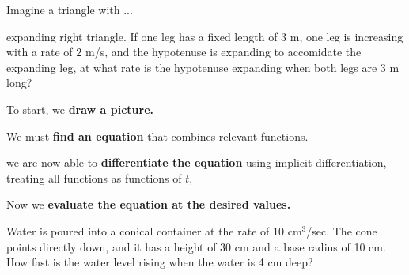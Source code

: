 \documentclass{ximera}
\begin{document}
\begin{example}
  Imagine a triangle with ...
  \begin{image}
  \end{image} 
  expanding right triangle. If one leg has a fixed length
  of $3$ m, one leg is increasing with a rate of $2$ m/s, and the
  hypotenuse is expanding to accomidate the expanding leg, at what
  rate is the hypotenuse expanding when both legs are $3$ m long? 
  \begin{explanation}
    To start, we \textbf{draw a picture.}
 

    We must \textbf{find an equation} that combines relevant
    functions.

    
    we are now able to \textbf{differentiate the equation} using
    implicit differentiation, treating all functions as functions of
    $t$,

   
    Now we \textbf{evaluate the equation at the desired values.}
    
  \end{explanation}
\end{example}



\begin{example} Water is poured into a conical container at the rate of 10
cm${}^3$/sec.  The cone points directly down, and it has a height of
30 cm and a base radius of 10 cm.  How fast is the water level rising
when the water is 4 cm deep?
\end{example}
\end{document}
